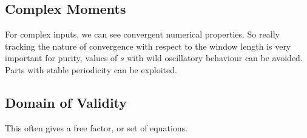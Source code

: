 \documentclass{article}
\begin{document}
\subsection{Complex Moments}
For complex inputs, we can see convergent numerical properties. So really tracking the nature of convergence with respect to the window length is very important for purity, values of $s$ with wild oscillatory behaviour can be avoided. Parts with stable periodicity can be exploited. 


\subsection{Domain of Validity}
This often gives a free factor, or set of equations.
\end{document}
